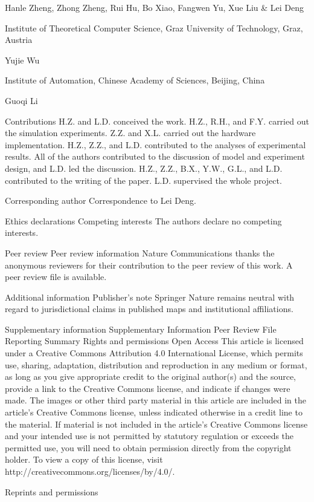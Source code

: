 Hanle Zheng, Zhong Zheng, Rui Hu, Bo Xiao, Fangwen Yu, Xue Liu & Lei Deng

Institute of Theoretical Computer Science, Graz University of Technology, Graz, Austria

Yujie Wu

Institute of Automation, Chinese Academy of Sciences, Beijing, China

Guoqi Li

Contributions
H.Z. and L.D. conceived the work. H.Z., R.H., and F.Y. carried out the simulation experiments. Z.Z. and X.L. carried out the hardware implementation. H.Z., Z.Z., and L.D. contributed to the analyses of experimental results. All of the authors contributed to the discussion of model and experiment design, and L.D. led the discussion. H.Z., Z.Z., B.X., Y.W., G.L., and L.D. contributed to the writing of the paper. L.D. supervised the whole project.

Corresponding author
Correspondence to Lei Deng.

Ethics declarations
Competing interests
The authors declare no competing interests.

Peer review
Peer review information
Nature Communications thanks the anonymous reviewers for their contribution to the peer review of this work. A peer review file is available.

Additional information
Publisher’s note Springer Nature remains neutral with regard to jurisdictional claims in published maps and institutional affiliations.

Supplementary information
Supplementary Information
Peer Review File
Reporting Summary
Rights and permissions
Open Access This article is licensed under a Creative Commons Attribution 4.0 International License, which permits use, sharing, adaptation, distribution and reproduction in any medium or format, as long as you give appropriate credit to the original author(s) and the source, provide a link to the Creative Commons license, and indicate if changes were made. The images or other third party material in this article are included in the article’s Creative Commons license, unless indicated otherwise in a credit line to the material. If material is not included in the article’s Creative Commons license and your intended use is not permitted by statutory regulation or exceeds the permitted use, you will need to obtain permission directly from the copyright holder. To view a copy of this license, visit http://creativecommons.org/licenses/by/4.0/.

Reprints and permissions


